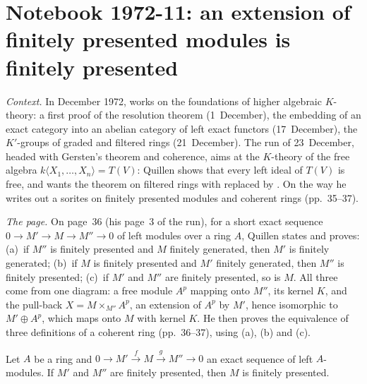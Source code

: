 \section[Notebook 1972-11: extensions of finitely presented modules]{Notebook 1972-11: an extension of finitely presented modules is finitely presented\protect{}}\label{sec:quillen-1972-11}

\emph{Context.} In December 1972,  works on the foundations of higher algebraic $K$-theory: a first proof of the resolution theorem (1~December), the embedding of an exact category into an abelian category of left exact functors (17~December), the $K'$-groups of graded and filtered rings (21~December). The run of 23~December, headed with Gersten's theorem and coherence, aims at the $K$-theory of the free algebra $k\langle X_1, \dots, X_n\rangle = T(V)$: Quillen shows that every left ideal of $T(V)$ is free, and wants the theorem on filtered rings with  replaced by . On the way he writes out a sorites on finitely presented modules and coherent rings (pp.~35--37).

\emph{The page.} On page~36 (his page~3 of the run), for a short exact sequence $0 \to M' \to M \to M'' \to 0$ of left modules over a ring $A$, Quillen states and proves: (a)~if $M''$ is finitely presented and $M$ finitely generated, then $M'$ is finitely generated; (b)~if $M$ is finitely presented and $M'$ finitely generated, then $M''$ is finitely presented; (c)~if $M'$ and $M''$ are finitely presented, so is $M$. All three come from one diagram: a free module $A^p$ mapping onto $M''$, its kernel $K$, and the pull-back $X = M \times_{M''} A^p$, an extension of $A^p$ by $M'$, hence isomorphic to $M' \oplus A^p$, which maps onto $M$ with kernel $K$. He then proves the equivalence of three definitions of a coherent ring (pp.~36--37), using (a), (b) and (c).

\begin{encadre}
\begin{theoreme}\label{thm:quillen-1972-11}
Let $A$ be a ring and $0 \to M' \xrightarrow{f} M \xrightarrow{g} M'' \to 0$ an exact sequence of left $A$-modules. If $M'$ and $M''$ are finitely presented, then $M$ is finitely presented.
\end{theoreme}
\end{encadre}

